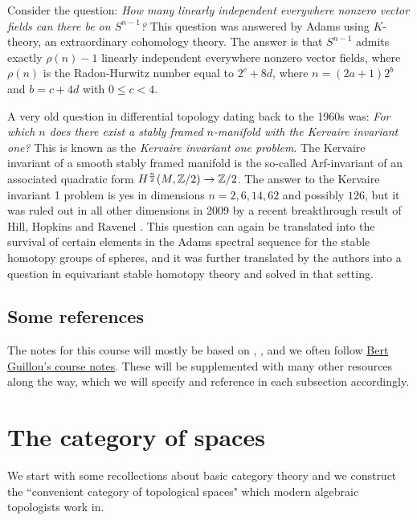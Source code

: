 \documentclass{article}[11pt]
\begin{document}
\begin{example} Consider the question: \emph{How many linearly independent everywhere nonzero vector fields can there be on $S^{n-1}$?} This question was answered by Adams using $K$-theory, an extraordinary cohomology theory. The answer is that $S^{n-1}$ admits exactly $\rho(n)-1$ linearly independent everywhere nonzero vector fields, where $\rho(n)$ is the Radon-Hurwitz number equal to $2^c+8d$, where $n=(2a+1)2^b$ and $b=c+4d$ with $0\leq c<4$.
\end{example}

\begin{example} A very old question in differential topology dating back to the 1960s was: \emph{For which $n$ does there exist a stably framed $n$-manifold with the Kervaire invariant one?} This is known as the \emph{Kervaire invariant one problem}. The Kervaire invariant of a smooth stably framed manifold is the so-called Arf-invariant of an associated quadratic form $H^{\frac{n}{2}}(M, \mathbb{Z}/2)\to\mathbb{Z}/2$. The answer to the Kervaire invariant 1 problem is yes in dimensions $n=2,6,14,62$ and possibly $126$, but it was ruled out in all other dimensions in 2009 by a recent breakthrough result of Hill, Hopkins and Ravenel \cite{HHR}. This question can again be translated into the survival of certain elements in the Adams spectral sequence for the stable homotopy groups of spheres, and it was further translated by the authors into a question in equivariant stable homotopy theory and solved in that setting.
\end{example}

\subsection{Some references}
The notes for this course will mostly be based on \cite{may}, \cite{hatcher}, and we often follow \href{http://www.ms.uky.edu/~guillou/S11/527.html}{Bert Guillou's course notes}. These will be supplemented with many other resources along the way, which we will specify and reference in each subsection accordingly.


\section{The category of spaces}

We start with some recollections about basic category theory and we construct the ``convenient category of topological spaces" which modern algebraic topologists work in.
\end{document}
